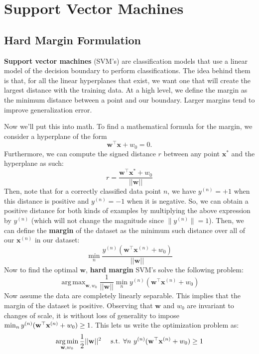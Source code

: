 \documentclass[11pt, letterpaper]{article}
\DeclareMathOperator*{\argmax}{arg\,max}
\theoremstyle{definition}
\theoremstyle{plain}
\begin{document}
\section{Support Vector Machines}

\subsection{Hard Margin Formulation}
\textbf{Support vector machines} (SVM's) are classification models that use a linear model of the decision boundary to perform classifications. The idea behind them is that, for all the linear hyperplanes that exist, we want one that will create the largest distance with the training data. At a high level, we define the margin as the minimum distance between a point and our boundary. Larger margins tend to improve generalization error.

Now we'll put this into math. To find a mathematical formula for the margin, we consider a hyperplane of the form
\[\bm{w}^\top \bm x + w_0 = 0.\]
Furthermore, we can compute the signed distance $r$ between any point $\bm{x}^*$ and the hyperplane as such:
\[r = \frac{\bm{w}^\top\bm{x}^*+w_0}{||\bm{w}||}\]
Then, note that for a correctly classified data point $n$, we have $y^{(n)}=+1$ when this distance is positive and $y^{(n)}=-1$ when it is negative. So, we can obtain a positive distance for both kinds of examples by multiplying the above expression by $y^{(n)}$ (which will not change the magnitude since $\|y^{(n)}\| =  1$). Then, we can define the \textbf{margin }of the dataset as the minimum such distance over all of our $\bm{x}^{(n)}$ in our dataset:
\[\min_{n} \frac{y^{(n)}(\bm{w}^\top\bm{x}^{(n)} + w_0)}{||\bm{w}||}\]
Now to find the optimal $\bm{w}$, \textbf{hard margin} SVM's solve the following problem:
\[\argmax_{\bm{w},w_0} \frac{1}{||\bm{w}||} \min_n y^{(n)}(\bm{w}^\top\bm{x}^{(n)}+w_0)\]
Now assume the data are completely linearly separable. This implies that the margin of the dataset is positive. Observing that $\bm{w}$ and $w_0$ are invariant to changes of scale, it is without loss of generality to impose
$\min_{n} y^{(n)}(\mathbf{w}^\top\mathbf{x}^{(n)} + w_0) \ge 1$. This lets
us write the optimization problem as:
\[\argmin_{\boldw, w_0} \frac{1}{2}||\boldw||^2 \quad \text{ s.t. }\forall n\text{ }
y^{(n)}(\boldw^\top\boldx^{(n)}+w_0) \geq 1\]
\end{document}
